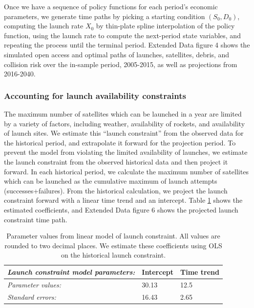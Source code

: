 \documentclass[9pt,twoside,lineno]{pnas-new}
\begin{document}
Once we have a sequence of policy functions for each period's economic parameters, we generate time paths by picking a starting condition $(S_0,D_0)$, computing the launch rate $X_0$ by thin-plate spline interpolation of the policy function, using the launch rate to compute the next-period state variables, and repeating the process until the terminal period. Extended Data figure 4 shows the simulated open access and optimal paths of launches, satellites, debris, and collision risk over the in-sample period, 2005-2015, as well as projections from 2016-2040. 

\subsubsection{Accounting for launch availability constraints}
\label{launch_constraint}


The maximum number of satellites which can be launched in a year are limited by a variety of factors, including weather, availability of rockets, and availability of launch sites. We estimate this ``launch constraint'' from the observed data for the historical period, and extrapolate it forward for the projection period. To prevent the model from violating the limited availability of launches, we estimate the launch constraint from the observed historical data and then project it forward. In each historical period, we calculate the maximum number of satellites which can be launched as the cumulative maximum of launch attempts (successes+failures). From the historical calculation, we project the launch constraint forward with a linear time trend and an intercept. Table \ref{lc_coefs} shows the estimated coefficients, and Extended Data figure 6 shows the projected launch constraint time path. \\

\begin{table}[H]
	\centering
	\begin{tabular}{|l|l|l|}
		\hline
		\textit{Launch constraint model parameters:} & Intercept & Time trend \\ \hline
		\textit{Parameter values:}                   & 30.13     & 12.5       \\ \hline
		\textit{Standard errors:}                    & 16.43     & 2.65       \\ \hline
	\end{tabular}
	\caption[Parameter values from linear model of launch constraint]{Parameter values from linear model of launch constraint. All values are rounded to two decimal places. We estimate these coefficients using OLS on the historical launch constraint.}
	\label{lc_coefs}
\end{table}
\end{document}
